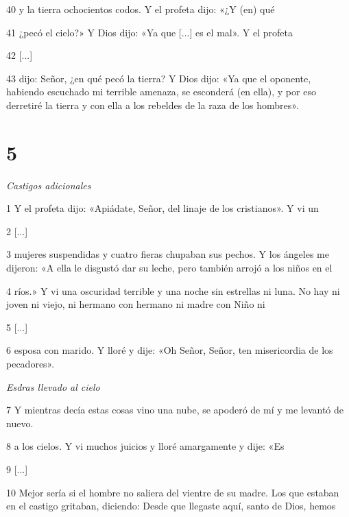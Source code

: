 \par 40 y la tierra ochocientos codos. Y el profeta dijo: «¿Y (en) qué

\par 41 ¿pecó el cielo?» Y Dios dijo: «Ya que [...] es el mal». Y el profeta

\par 42 [...]

\par 43 dijo: Señor, ¿en qué pecó la tierra? Y Dios dijo: «Ya que el oponente, habiendo escuchado mi terrible amenaza, se esconderá (en ella), y por eso derretiré la tierra y con ella a los rebeldes de la raza de los hombres».

\chapter{5}

\par \textit{Castigos adicionales}

\par 1 Y el profeta dijo: «Apiádate, Señor, del linaje de los cristianos». Y vi un

\par 2 [...]

\par 3 mujeres suspendidas y cuatro fieras chupaban sus pechos. Y los ángeles me dijeron: «A ella le disgustó dar su leche, pero también arrojó a los niños en el

\par 4 ríos.» Y vi una oscuridad terrible y una noche sin estrellas ni luna. No hay ni joven ni viejo, ni hermano con hermano ni madre con Niño ni

\par 5 [...]

\par 6 esposa con marido. Y lloré y dije: «Oh Señor, Señor, ten misericordia de los pecadores».

\par \textit{Esdras llevado al cielo}

\par 7 Y mientras decía estas cosas vino una nube, se apoderó de mí y me levantó de nuevo.

\par 8 a los cielos. Y vi muchos juicios y lloré amargamente y dije: «Es

\par 9 [...]

\par 10 Mejor sería si el hombre no saliera del vientre de su madre. Los que estaban en el castigo gritaban, diciendo: Desde que llegaste aquí, santo de Dios, hemos

